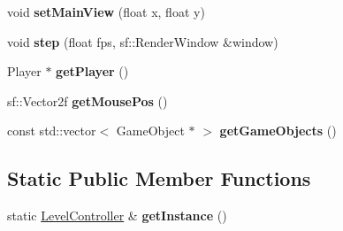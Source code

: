 \begin{DoxyCompactItemize}
\item 
\hypertarget{class_level_controller_a60cba41df915fcfa0fbb4bff105923e0}{void {\bfseries set\-Main\-View} (float x, float y)}\label{class_level_controller_a60cba41df915fcfa0fbb4bff105923e0}

\item 
\hypertarget{class_level_controller_acc3a82f2de457b3cb3863c5bb49a909c}{void {\bfseries step} (float fps, sf\-::\-Render\-Window \&window)}\label{class_level_controller_acc3a82f2de457b3cb3863c5bb49a909c}

\item 
\hypertarget{class_level_controller_a203ded80ef03720a9e9069d54e500689}{Player $\ast$ {\bfseries get\-Player} ()}\label{class_level_controller_a203ded80ef03720a9e9069d54e500689}

\item 
\hypertarget{class_level_controller_ac08e5cb1592d8e7378253732e9989801}{sf\-::\-Vector2f {\bfseries get\-Mouse\-Pos} ()}\label{class_level_controller_ac08e5cb1592d8e7378253732e9989801}

\item 
\hypertarget{class_level_controller_a331dc36b48234e99d07a6db68e700297}{const std\-::vector$<$ Game\-Object $\ast$ $>$ {\bfseries get\-Game\-Objects} ()}\label{class_level_controller_a331dc36b48234e99d07a6db68e700297}

\end{DoxyCompactItemize}
\subsection*{Static Public Member Functions}
\begin{DoxyCompactItemize}
\item 
\hypertarget{class_level_controller_aff1d9aba9f9fb043e644cc4c01869b7f}{static \hyperlink{class_level_controller}{Level\-Controller} \& {\bfseries get\-Instance} ()}\label{class_level_controller_aff1d9aba9f9fb043e644cc4c01869b7f}

\end{DoxyCompactItemize}
